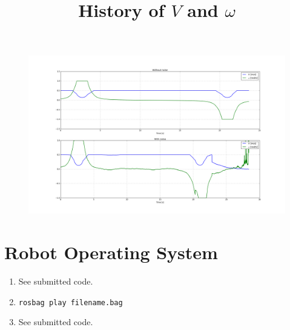 \documentclass[12pt]{article}
\begin{document}
\begin{enumerate}
\begin{figure}[H]
	\end{figure}
	\begin{figure}[H]
		\centering
		\title{\bf History of $V$ and $\omega$}
		\includegraphics[width=\textwidth]{../Figures/hw1_4_iv_ctrl.png}
	\end{figure}
\end{enumerate}

\section{Robot Operating System}
\begin{enumerate}
	\item See submitted code.
	\item \verb|rosbag play filename.bag|
	\item See submitted code.
\end{enumerate}
\end{document}
